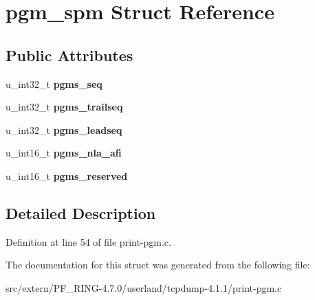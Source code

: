 \hypertarget{structpgm__spm}{
\section{pgm\_\-spm Struct Reference}
\label{structpgm__spm}
}
\subsection*{Public Attributes}
\begin{DoxyCompactItemize}
\item 
\hypertarget{structpgm__spm_a2dbdf18e430442786332cf1f0cfc56e2}{
u\_\-int32\_\-t {\bfseries pgms\_\-seq}}
\label{structpgm__spm_a2dbdf18e430442786332cf1f0cfc56e2}

\item 
\hypertarget{structpgm__spm_ae9accca1b9e9b3a128d21a793e338625}{
u\_\-int32\_\-t {\bfseries pgms\_\-trailseq}}
\label{structpgm__spm_ae9accca1b9e9b3a128d21a793e338625}

\item 
\hypertarget{structpgm__spm_ac603eda21f522a824bbc6050e1f733eb}{
u\_\-int32\_\-t {\bfseries pgms\_\-leadseq}}
\label{structpgm__spm_ac603eda21f522a824bbc6050e1f733eb}

\item 
\hypertarget{structpgm__spm_ae5c8230a5ca27b45f4ef8e227f593b99}{
u\_\-int16\_\-t {\bfseries pgms\_\-nla\_\-afi}}
\label{structpgm__spm_ae5c8230a5ca27b45f4ef8e227f593b99}

\item 
\hypertarget{structpgm__spm_a6577d47eaca0fbb9addf4a654170bd78}{
u\_\-int16\_\-t {\bfseries pgms\_\-reserved}}
\label{structpgm__spm_a6577d47eaca0fbb9addf4a654170bd78}

\end{DoxyCompactItemize}


\subsection{Detailed Description}


Definition at line 54 of file print-\/pgm.c.



The documentation for this struct was generated from the following file:\begin{DoxyCompactItemize}
\item 
src/extern/PF\_\-RING-\/4.7.0/userland/tcpdump-\/4.1.1/print-\/pgm.c\end{DoxyCompactItemize}
